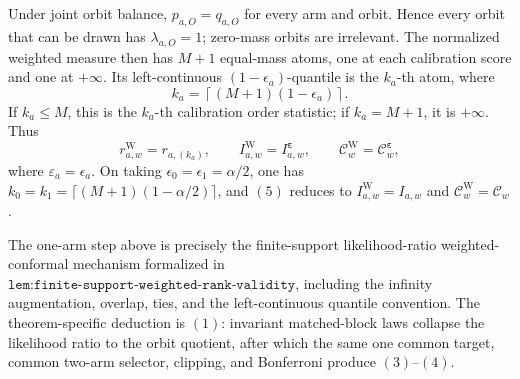 Under joint orbit balance, \(p_{a,O}=q_{a,O}\) for every arm and orbit. Hence every orbit that can be drawn has \(\lambda_{a,O}=1\); zero-mass orbits are irrelevant. The normalized weighted measure then has \(M+1\) equal-mass atoms, one at each calibration score and one at \(+\infty\). Its left-continuous \((1-\epsilon_a)\)-quantile is the \(k_a\)-th atom, where
\[
k_a=\left\lceil(M+1)(1-\epsilon_a)\right\rceil.
\]
If \(k_a\le M\), this is the \(k_a\)-th calibration order statistic; if \(k_a=M+1\), it is \(+\infty\). Thus
\[
r^{\mathrm W}_{a,w}=r_{a,(k_a)},\qquad I^{\mathrm W}_{a,w}=I^{\boldsymbol\varepsilon}_{a,w},\qquad \mathcal C^{\mathrm W}_w=\mathcal C^{\boldsymbol\varepsilon}_w,\tag{5}
\]
where \(\varepsilon_a=\epsilon_a\). On taking \(\epsilon_0=\epsilon_1=\alpha/2\), one has \(k_0=k_1=\lceil(M+1)(1-\alpha/2)\rceil\), and \((5)\) reduces to \(I^{\mathrm W}_{a,w}=I_{a,w}\) and \(\mathcal C^{\mathrm W}_w=\mathcal C_w\).

The one-arm step above is precisely the finite-support likelihood-ratio weighted-conformal mechanism formalized in \(\texttt{lem:finite-support-weighted-rank-validity}\), including the infinity augmentation, overlap, ties, and the left-continuous quantile convention. The theorem-specific deduction is \((1)\): invariant matched-block laws collapse the likelihood ratio to the orbit quotient, after which the same one common target, common two-arm selector, clipping, and Bonferroni produce \((3)\)--\((4)\).